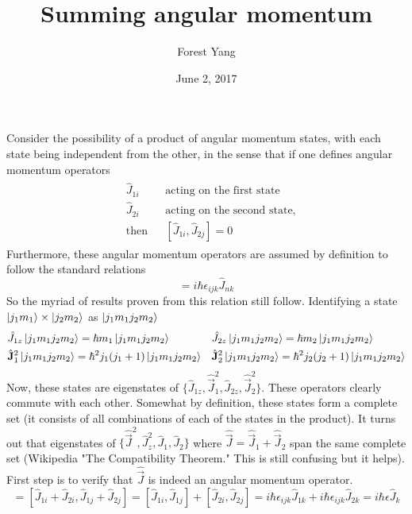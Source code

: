 \documentclass{article}
\title{Summing angular momentum}
\author{Forest Yang}
\date{June 2, 2017}
\begin{document}
\maketitle
Consider the possibility of a product of angular momentum states, with each state being independent from the other, in the sense that if one defines angular momentum operators
\begin{align*}
\begin{aligned}
&\hat{J}_{1i} && \text{acting on the first state} \\
&\hat{J}_{2i} && \text{acting on the second state,} \\
&\text{then} && [\hat{J}_{1i}, \hat{J}_{2j}] = 0
\end{aligned}
\end{align*}
Furthermore, these angular momentum operators are assumed by definition to follow the standard relations \begin{equation*}  [\hat{J}_{ni}, \hat{J}_{nj}] = i\hbar\epsilon_{ijk}\hat{J}_{nk}\end{equation*}
So the myriad of results proven from this relation still follow. Identifying a state $\ket{j_1 m_1} \times \ket{j_2 m_2}$ as $\ket{j_1 m_1 j_2 m_2}$
\begin{align*}
\begin{aligned}
& \hat{J}_{1z}\ket{j_1 m_1 j_2 m_2} = \hbar m_1 \ket{j_1 m_1 j_2 m_2} && \hat{J}_{2z}\ket{j_1 m_1 j_2 m_2} = \hbar m_2 \ket{j_1 m_1 j_2 m_2} \\
& \hat{\mathbf{J}}^2_{1}\ket{j_1 m_1 j_2 m_2} = \hbar^2 j_1(j_1+1) \ket{j_1 m_1 j_2 m_2} && \hat{\mathbf{J}}_{2}^2\ket{j_1m_1j_2m_2} = \hbar^2j_2(j_2+1)\ket{j_1 m_1 j_2 m_2}
\end{aligned}
\end{align*}
Now, these states are eigenstates of $\{\hat{J}_{1z}, \hat{\vec{J}}_1^2, \hat{J}_{2z}, \hat{\vec{J}}_2^2\}$. These operators clearly commute with each other. Somewhat by definition, these states form a complete set (it consists of all combinations of each of the states in the product). It turns out that eigenstates of $\{\hat{\vec{J}}^2, \hat{J}_z^2, \hat{J}_1, \hat{J}_2\}$ where $\hat{\vec{J}} = \hat{\vec{J}}_1 + \hat{\vec{J}}_2$  span the same complete set (Wikipedia "The Compatibility Theorem." This is still confusing but it helps). First step is to verify that $\hat{\vec{J}}$ is indeed an angular momentum operator.
 \begin{equation*} [\hat{J}_i, \hat{J}_j] = [\hat{J}_{1i} + \hat{J}_{2i}, \hat{J}_{1j} + \hat{J}_{2j}] = [\hat{J}_{1i}, \hat{J}_{1j}] + [\hat{J}_{2i}, \hat{J}_{2j}] = i\hbar\epsilon_{ijk}\hat{J}_{1k} + i\hbar\epsilon_{ijk}\hat{J}_{2k} = i\hbar\epsilon\hat{J}_{k}\end{equation*}
\end{document}
